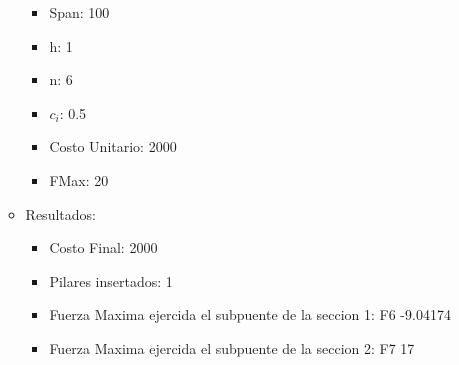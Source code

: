 \begin{itemize}
\begin{itemize}
	  \begin{itemize}
	    \item Span: 100
	    \item h: 1
	    \item n: 6
	    \item $c_i$: 0.5
	    \item Costo Unitario: 2000
	    \item FMax: 20
	  \end{itemize}
      \item Resultados:
	  \begin{itemize}
	    \item Costo Final: 2000
	    \item Pilares insertados: 1
	    \item Fuerza Maxima ejercida el subpuente de la seccion 1: F6 -9.04174
	    \item Fuerza Maxima ejercida el subpuente de la seccion 2: F7 17
	  \end{itemize}
      \end{itemize}
\end{itemize}
